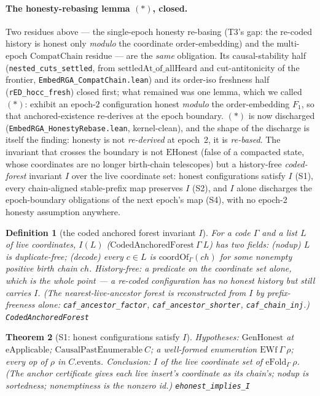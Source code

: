 \documentclass[11pt]{article}
\newtheorem{theorem}{Theorem}[section]
\newtheorem{definition}[theorem]{Definition}
\newcommand{\lean}[1]{\texttt{#1}}
\newcommand{\code}[1]{\texttt{#1}}
\begin{document}
\paragraph{The honesty-rebasing lemma $(\ast)$, closed.} Two residues
above --- the single-epoch honesty re-basing (T3's gap: the re-coded
history is honest only \emph{modulo} the coordinate order-embedding) and
the multi-epoch $\mathrm{CompatChain}$ residue --- are the \emph{same}
obligation. Its causal-stability half (\lean{nested\_cuts\_settled},
from $\mathrm{settledAt\_of\_allHeard}$ and cut-antitonicity of the
frontier, \code{EmbedRGA\_CompatChain.lean}) and its order-iso freshness
half (\lean{rED\_hocc\_fresh}) closed first; what remained was one
lemma, which we called $(\ast)$: exhibit an epoch-$2$ configuration
honest \emph{modulo} the order-embedding $F_1$, so that
anchored-existence re-derives at the epoch boundary. $(\ast)$ is now
discharged (\code{EmbedRGA\_HonestyRebase.lean}, kernel-clean), and the
shape of the discharge is itself the finding: honesty is not
\emph{re-derived} at epoch~2, it is \emph{re-based}. The invariant that
crosses the boundary is not $\mathrm{EHonest}$ (false of a compacted
state, whose coordinates are no longer birth-chain telescopes) but a
history-free \emph{coded-forest} invariant $I$ over the live coordinate
set: honest configurations satisfy $I$ (S1), every chain-aligned
stable-prefix map preserves $I$ (S2), and $I$ alone discharges the
epoch-boundary obligations of the next epoch's map (S4), with no
epoch-2 honesty assumption anywhere.

\begin{definition}[the coded anchored forest invariant $I$]
\label{def:caf}
For a code $\Gamma$ and a list $L$ of live coordinates, $I(L)$
($\mathrm{CodedAnchoredForest}\ \Gamma\ L$) has two fields:
(\emph{nodup}) $L$ is duplicate-free; (\emph{decode}) every $c \in L$
is $\mathrm{coordOf}_\Gamma(\mathit{ch})$ for some \emph{nonempty
positive} birth chain $\mathit{ch}$. History-free: a predicate on the
coordinate set alone, which is the whole point --- a re-coded
configuration has no honest history but still carries $I$. (The
nearest-live-ancestor forest is reconstructed from $I$ by
prefix-freeness alone: \lean{caf\_ancestor\_factor},
\lean{caf\_ancestor\_shorter}, \lean{caf\_chain\_inj}.)
\hfill\lean{CodedAnchoredForest}
\end{definition}

\begin{theorem}[S1: honest configurations satisfy $I$]
\label{thm:ehonesti}
Hypotheses: $\mathrm{GenHonest}$ at $\mathrm{eApplicable}$;
$\mathrm{CausalPastEnumerable}\ C$; a well-formed enumeration
$\mathrm{EWf}\ \Gamma\ \rho$; every op of $\rho$ in
$C.\mathrm{events}$. Conclusion: $I$ of the live coordinate set of
$\mathrm{eFold}_\Gamma\ \rho$. (The anchor certificate gives each live
insert's coordinate as its chain's; nodup is sortedness; nonemptiness
is the nonzero id.)
\hfill\lean{ehonest\_implies\_I}
\end{theorem}
\end{document}
